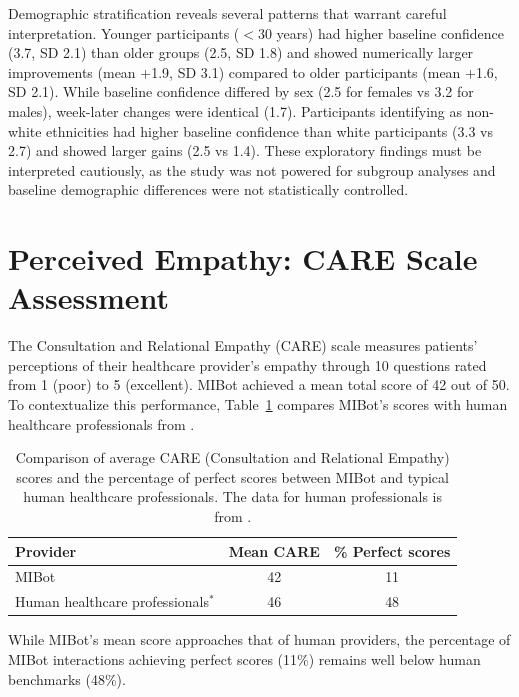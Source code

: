 Demographic stratification reveals several patterns that warrant careful interpretation. Younger participants ($<30$ years) had higher baseline confidence (3.7, SD 2.1) than older groups (2.5, SD 1.8) and showed numerically larger improvements (mean +1.9, SD 3.1) compared to older participants (mean +1.6, SD 2.1). While baseline confidence differed by sex (2.5 for females vs 3.2 for males), week-later changes were identical (1.7). Participants identifying as non-white ethnicities had higher baseline confidence than white participants (3.3 vs 2.7) and showed larger gains (2.5 vs 1.4). These exploratory findings must be interpreted cautiously, as the study was not powered for subgroup analyses and baseline demographic differences were not statistically controlled.


\section{Perceived Empathy: CARE Scale Assessment}
\label{sec:perceived-empathy}

The Consultation and Relational Empathy (CARE) scale \citep{10.1093/fampra/cmh621} measures patients' perceptions of their healthcare provider's empathy through 10 questions rated from 1 (poor) to 5 (excellent). MIBot achieved a mean total score of 42 out of 50. To contextualize this performance, Table~\ref{table:care_comparison} compares MIBot's scores with human healthcare professionals from \citet{Bikker2015}.

\begin{table}[ht]
  \centering
  \small
  \setlength{\tabcolsep}{4pt}
  \renewcommand{\arraystretch}{1.1}
  \begin{tabular}{@{}lcc@{}}
    \toprule
    \textbf{Provider} & \textbf{Mean CARE} & \textbf{\% Perfect scores} \\
    \midrule
    MIBot & 42 & 11 \\
    Human healthcare professionals$^*$ & 46 & 48 \\
    \bottomrule
  \end{tabular}
  \caption[MIBot vs. Human CARE Scores]{Comparison of average CARE (Consultation and Relational Empathy) scores and the percentage of perfect scores between MIBot and typical human healthcare professionals. The data for human professionals is from \cite{Bikker2015}.}
  \label{table:care_comparison}
\end{table}

While MIBot's mean score approaches that of human providers, the percentage of MIBot interactions achieving perfect scores (11\%) remains well below human benchmarks (48\%).

